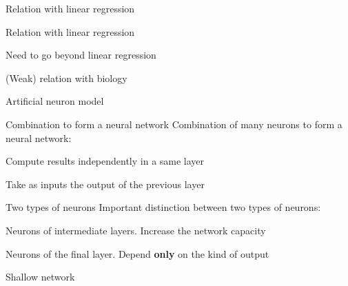 \begin{frame}{Relation with linear regression}
\end{frame}

\begin{frame}{Relation with linear regression}
\end{frame}

\begin{frame}{Need to go beyond linear regression}
\end{frame}

\begin{frame}{(Weak) relation with biology}
\end{frame}

\begin{frame}{Artificial neuron model}
\end{frame}

\begin{frame}{Combination to form a neural network}
  Combination of many neurons to form a neural network:
  \begin{description}[<+(1)->]
    \item[In parallel] Compute results independently in a same layer
    \item[In series] Take as inputs the output of the previous layer
  \end{description}
\end{frame}

\begin{frame}{Two types of neurons}
  Important distinction between two types of neurons:
  \begin{description}[<+(1)->]
    \item[Hidden neurons] Neurons of intermediate layers. Increase the network capacity
    \item[Output neurons] Neurons of the final layer. Depend \textbf{only} on the kind of output
  \end{description}
\end{frame}

\begin{frame}{Shallow network}
  \centering
\end{frame}

